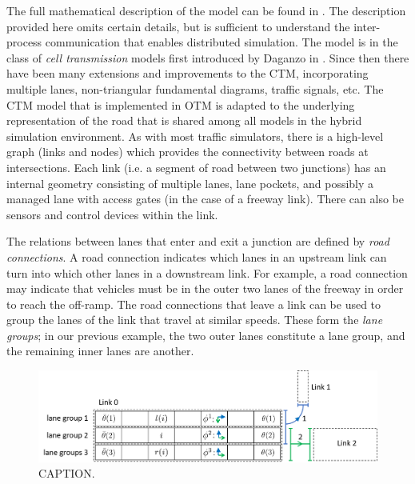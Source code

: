 The full mathematical description of the model can be found in \cite{Gomes2019OpenTM}. The description provided here omits certain details, but is sufficient to understand the inter-process communication that enables distributed simulation. The model is in the class of \textit{cell transmission} models first introduced by Daganzo in \cite{DaganzoCTM}. Since then there have been many extensions and improvements to the CTM, incorporating multiple lanes, non-triangular fundamental diagrams, traffic signals, etc. The CTM model that is implemented in OTM is adapted to the underlying representation of the road that is shared among all models in the hybrid simulation environment. As with most traffic simulators, there is a high-level graph (links and nodes) which provides the connectivity between roads at intersections. Each link (i.e. a segment of road between two junctions) has an internal geometry consisting of multiple lanes, lane pockets, and possibly a managed lane with access gates (in the case of a freeway link). There can also be sensors and control devices within the link. 

The relations between lanes that enter and exit a junction are defined by \textit{road connections}. A road connection indicates which lanes in an upstream link can turn into which other lanes in a downstream link. For example, a road connection may indicate that vehicles must be in the outer two lanes of the freeway in order to reach the off-ramp. The road connections that leave a link can be used to group the lanes of the link that travel at similar speeds. These form the \textit{lane groups}; in our previous example, the two outer lanes constitute a lane group, and the remaining inner lanes are another. 

\begin{figure}[h!]
    \centering
    \includegraphics[width=\columnwidth]{figs/cells.png}
    \caption{CAPTION.}
    \label{fig:cells}
\end{figure}

